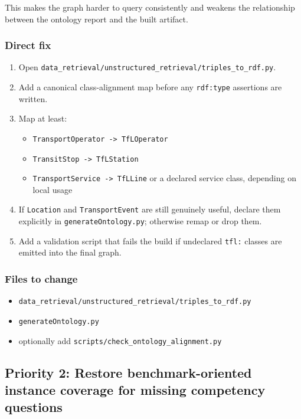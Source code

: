 \documentclass[
  11pt,
  a4paper,
]{article}
\providecommand{\tightlist}{%
  \setlength{\itemsep}{0pt}\setlength{\parskip}{0pt}}
\begin{document}
This makes the graph harder to query consistently and weakens the
relationship between the ontology report and the built artifact.

\subsubsection{Direct fix}\label{direct-fix}

\begin{enumerate}
\def\labelenumi{\arabic{enumi}.}
\tightlist
\item
  Open
  \texttt{data\_retrieval/unstructured\_retrieval/triples\_to\_rdf.py}.
\item
  Add a canonical class-alignment map before any \texttt{rdf:type}
  assertions are written.
\item
  Map at least:

  \begin{itemize}
  \tightlist
  \item
    \texttt{TransportOperator\ -\textgreater{}\ TfLOperator}
  \item
    \texttt{TransitStop\ -\textgreater{}\ TfLStation}
  \item
    \texttt{TransportService\ -\textgreater{}\ TfLLine} or a declared
    service class, depending on local usage
  \end{itemize}
\item
  If \texttt{Location} and \texttt{TransportEvent} are still genuinely
  useful, declare them explicitly in \texttt{generateOntology.py};
  otherwise remap or drop them.
\item
  Add a validation script that fails the build if undeclared
  \texttt{tfl:} classes are emitted into the final graph.
\end{enumerate}

\subsubsection{Files to change}\label{files-to-change}

\begin{itemize}
\tightlist
\item
  \texttt{data\_retrieval/unstructured\_retrieval/triples\_to\_rdf.py}
\item
  \texttt{generateOntology.py}
\item
  optionally add \texttt{scripts/check\_ontology\_alignment.py}
\end{itemize}

\subsection{Priority 2: Restore benchmark-oriented instance coverage for
missing competency
questions}\label{priority-2-restore-benchmark-oriented-instance-coverage-for-missing-competency-questions}
\end{document}
